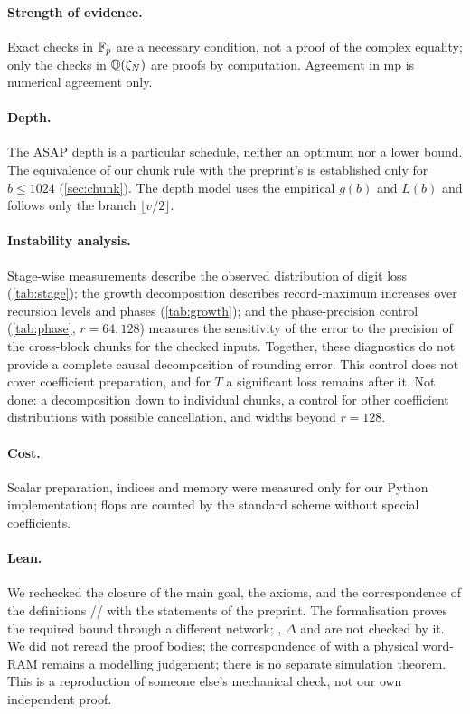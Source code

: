 \documentclass[11pt]{article}
\theoremstyle{plain}
\begin{document}
\paragraph{Strength of evidence.}
Exact checks in $\mathbb{F}_p$ are a necessary condition, not a proof of the complex equality; only the checks in $\mathbb{Q}(\zeta_N)$ are proofs by computation. Agreement in mp is numerical agreement only.

\paragraph{Depth.}
The ASAP depth is a particular schedule, neither an optimum nor a lower bound. The equivalence of our chunk rule with the preprint's is established only for $b\le1024$ (\cref{sec:chunk}). The depth model uses the empirical $g(b)$ and $L(b)$ and follows only the branch $\lfloor v/2\rfloor$.

\paragraph{Instability analysis.}
Stage-wise measurements describe the observed distribution of digit loss (\cref{tab:stage}); the growth decomposition describes record-maximum increases over recursion levels and phases (\cref{tab:growth}); and the phase-precision control (\cref{tab:phase}, $r=64,128$) measures the sensitivity of the error to the precision of the cross-block chunks for the checked inputs. Together, these diagnostics do not provide a complete causal decomposition of rounding error. This control does not cover coefficient preparation, and for $T$ a significant loss remains after it. Not done: a decomposition down to individual chunks, a control for other coefficient distributions with possible cancellation, and widths beyond $r=128$.

\paragraph{Cost.}
Scalar preparation, indices and memory were measured only for our Python implementation; flops are counted by the standard scheme without special coefficients.

\paragraph{Lean.}
We rechecked the closure of the main goal, the axioms, and the correspondence of the definitions // with the statements of the preprint. The formalisation proves the required bound through a different network; , $\Delta$ and  are not checked by it. We did not reread the proof bodies; the correspondence of  with a physical word-RAM remains a modelling judgement; there is no separate simulation theorem. This is a reproduction of someone else's mechanical check, not our own independent proof.
\end{document}
